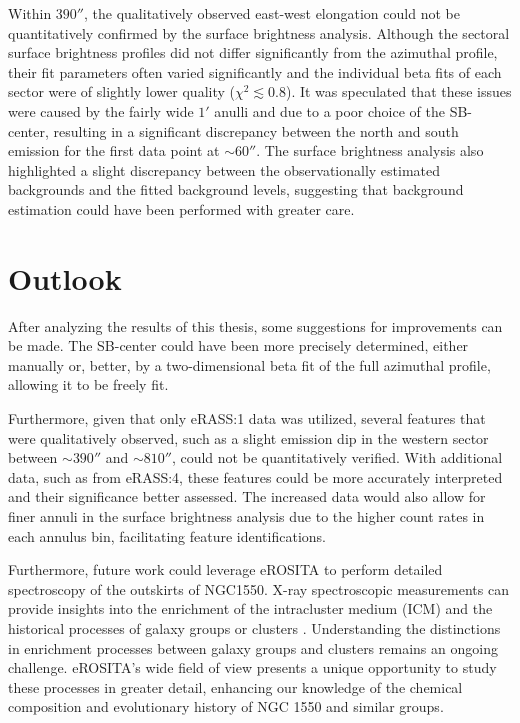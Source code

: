 Within \(390''\), the qualitatively observed east-west elongation could not be quantitatively confirmed by the surface brightness analysis. Although the sectoral surface brightness profiles did not differ significantly from the azimuthal profile, their fit parameters often varied significantly and the individual beta fits of each sector were of slightly lower quality (\(\chi^2 \lesssim 0.8\)). It was speculated that these issues were caused by the fairly wide \(1'\) anulli and due to a poor choice of the SB-center, resulting in a significant discrepancy between the north and south emission for the first data point at \(\sim 60''\). The surface brightness analysis also highlighted a slight discrepancy between the observationally estimated backgrounds and the fitted background levels, suggesting that background estimation could have been performed with greater care.   
\section{Outlook}
After analyzing the results of this thesis, some suggestions for improvements can be made. The SB-center could have been more precisely determined, either manually or, better, by a two-dimensional beta fit of the full azimuthal profile, allowing it to be freely fit.

Furthermore, given that only eRASS:1 data was utilized, several features that were qualitatively observed, such as a slight emission dip in the western sector between \(\sim 390''\) and \(\sim 810''\), could not be quantitatively verified. With additional data, such as from eRASS:4, these features could be more accurately interpreted and their significance better assessed. The increased data would also allow for finer annuli in the surface brightness analysis due to the higher count rates in each annulus bin, facilitating feature identifications.

Furthermore, future work could leverage eROSITA to perform detailed spectroscopy of the outskirts of NGC1550. X-ray spectroscopic measurements can provide insights into the enrichment of the intracluster medium (ICM) and the historical processes of galaxy groups or clusters \cite{Liu2020}. Understanding the distinctions in enrichment processes between galaxy groups and clusters remains an ongoing challenge. eROSITA's wide field of view presents a unique opportunity to study these processes in greater detail, enhancing our knowledge of the chemical composition and evolutionary history of NGC 1550 and similar groups.